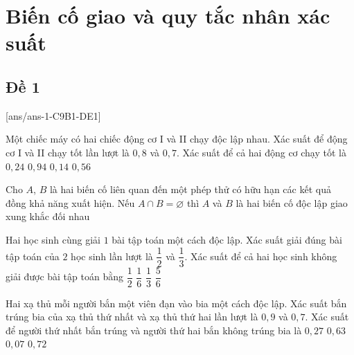 \section{Biến cố giao và quy tắc nhân xác suất}

\subsection{Đề 1}
[ans/ans-1-C9B1-DE1]
\caulc
\begin{ex}%
Một chiếc máy có hai chiếc động cơ I và II chạy độc lập nhau. Xác suất để động cơ I và II chạy tốt lần lượt là $0{,}8$ và $0{,}7$. Xác suất để cả hai động cơ chạy tốt là
\choice
		{$0{,}24$}
		{$0{,}94$}
		{$0{,}14$}
		{\True $0{,}56$}
\end{ex}
\begin{ex}%
Cho $A$, $B$ là hai biến cố liên quan đến một phép thử có hữu hạn các kết quả đồng khả năng xuất hiện. Nếu $A\cap B=\varnothing$ thì $A$ và $B$ là hai biến cố
	\choice
		{độc lập}
		{giao}
		{\True xung khắc}
		{đối nhau}
\end{ex}
\begin{ex}%
Hai học sinh cùng giải $1$ bài tập toán một cách độc lập. Xác suất giải đúng bài tập toán của $2$ học sinh lần lượt là $\dfrac{1}{2}$ và $\dfrac{1}{3}$. Xác suất để cả hai học sinh không giải được bài tập toán bằng
	\choice
		{$\dfrac{1}{2}$}
		{$\dfrac{1}{6}$}
		{\True $\dfrac{1}{3}$}
		{$\dfrac{5}{6}$}
\end{ex}
\begin{ex}%
Hai xạ thủ mỗi người bắn một viên đạn vào bia một cách độc lập. Xác suất bắn trúng bia của xạ thủ thứ nhất và xạ thủ thứ hai lần lượt là $0{,}9$ và $0{,}7$. Xác suất để người thứ nhất bắn trúng và người thứ hai bắn không trúng bia là
	\choice
		{\True $0{,}27$}
		{$0{,}63$}
		{$0{,}07$}
		{$0{,}72$}
\end{ex}
